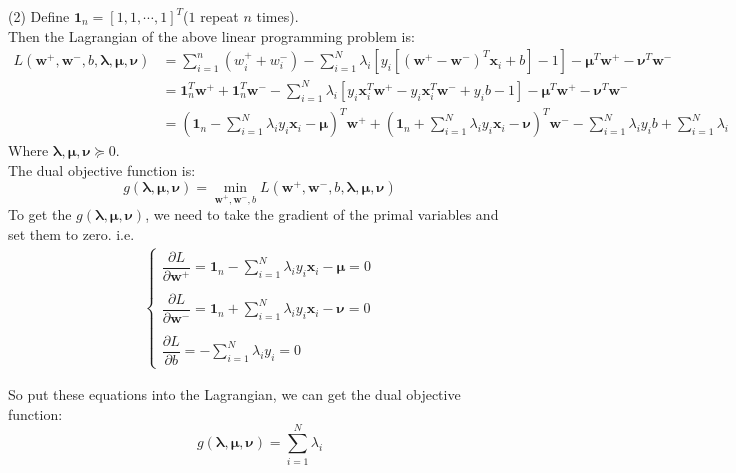 (2) Define $\mathbf{1}_n = [1, 1,\cdots, 1]^T$($1$ repeat $n$ times).\\
Then the Lagrangian of the above linear programming problem is:
\begin{align*}
    L(\mathbf{w^+}, \mathbf{w^-}, b, \boldsymbol{\lambda}, \boldsymbol{\mu}, \boldsymbol{\nu}) &= \sum_{i=1}^{n} (w_i^+ + w_i^-) - \sum_{i=1}^{N}\lambda_i\left[y_i\left[(\mathbf{w}^+-\mathbf{w}^-)^T\mathbf{x}_i+b\right]-1\right] - \boldsymbol{\mu}^T\mathbf{w}^+ - \boldsymbol{\nu}^T\mathbf{w}^- \\
    &= \mathbf{1}_n^T\mathbf{w}^+ + \mathbf{1}_n^T\mathbf{w}^- - \sum_{i=1}^{N}\lambda_i\left[y_i\mathbf{x}_i^T\mathbf{w}^+ - y_i\mathbf{x}_i^T\mathbf{w}^- +y_ib-1\right] - \boldsymbol{\mu}^T\mathbf{w}^+ - \boldsymbol{\nu}^T\mathbf{w}^- \\
    &= (\mathbf{1}_n - \sum_{i=1}^{N}\lambda_iy_i\mathbf{x}_i- \boldsymbol{\mu})^T\mathbf{w}^+ + (\mathbf{1}_n + \sum_{i=1}^{N}\lambda_iy_i\mathbf{x}_i- \boldsymbol{\nu})^T\mathbf{w}^- - \sum_{i=1}^{N}\lambda_iy_ib + \sum_{i=1}^{N}\lambda_i
\end{align*}
Where $\boldsymbol{\lambda}, \boldsymbol{\mu}, \boldsymbol{\nu}\succeq 0$.\\
The dual objective function is:
$$g(\boldsymbol{\lambda}, \boldsymbol{\mu}, \boldsymbol{\nu}) = \min_{\mathbf{w^+}, \mathbf{w^-}, b} L(\mathbf{w^+}, \mathbf{w^-}, b, \boldsymbol{\lambda}, \boldsymbol{\mu}, \boldsymbol{\nu})$$
To get the $g(\boldsymbol{\lambda}, \boldsymbol{\mu}, \boldsymbol{\nu})$, we need to take the gradient of the primal variables and set them to zero. i.e.
\begin{align*}
\left\{\begin{array}{l}
    \dfrac{\partial L}{\partial \mathbf{w}^+} = \mathbf{1}_n - \sum\limits_{i=1}^{N}\lambda_iy_i\mathbf{x}_i- \boldsymbol{\mu} = 0 \\\\
    \dfrac{\partial L}{\partial \mathbf{w}^-} = \mathbf{1}_n + \sum\limits_{i=1}^{N}\lambda_iy_i\mathbf{x}_i- \boldsymbol{\nu} = 0 \\\\
    \dfrac{\partial L}{\partial b} = -\sum\limits_{i=1}^{N}\lambda_iy_i = 0
    \end{array}\right.
\end{align*}

So put these equations into the Lagrangian, we can get the dual objective function:
$$g(\boldsymbol{\lambda}, \boldsymbol{\mu}, \boldsymbol{\nu}) = \sum_{i=1}^{N}\lambda_i$$

